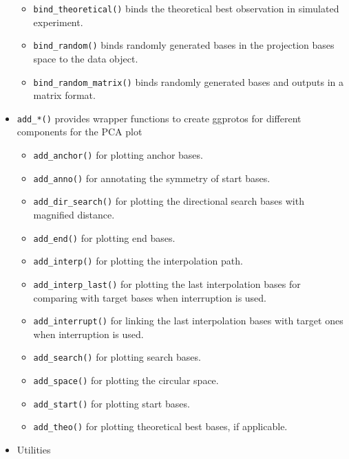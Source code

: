 \begin{itemize}
  \begin{itemize}
  \tightlist
  \item
    \texttt{bind\_theoretical()} binds the theoretical best observation
    in simulated experiment.
  \item
    \texttt{bind\_random()} binds randomly generated bases in the
    projection bases space to the data object.
  \item
    \texttt{bind\_random\_matrix()} binds randomly generated bases and
    outputs in a matrix format.
  \end{itemize}
\item
  \texttt{add\_*()} provides wrapper functions to create ggprotos for
  different components for the PCA plot

  \begin{itemize}
  \tightlist
  \item
    \texttt{add\_anchor()} for plotting anchor bases.
  \item
    \texttt{add\_anno()} for annotating the symmetry of start bases.
  \item
    \texttt{add\_dir\_search()} for plotting the directional search
    bases with magnified distance.
  \item
    \texttt{add\_end()} for plotting end bases.
  \item
    \texttt{add\_interp()} for plotting the interpolation path.
  \item
    \texttt{add\_interp\_last()} for plotting the last interpolation
    bases for comparing with target bases when interruption is used.
  \item
    \texttt{add\_interrupt()} for linking the last interpolation bases
    with target ones when interruption is used.
  \item
    \texttt{add\_search()} for plotting search bases.
  \item
    \texttt{add\_space()} for plotting the circular space.
  \item
    \texttt{add\_start()} for plotting start bases.
  \item
    \texttt{add\_theo()} for plotting theoretical best bases, if
    applicable.
  \end{itemize}
\item
  Utilities


\end{itemize}
